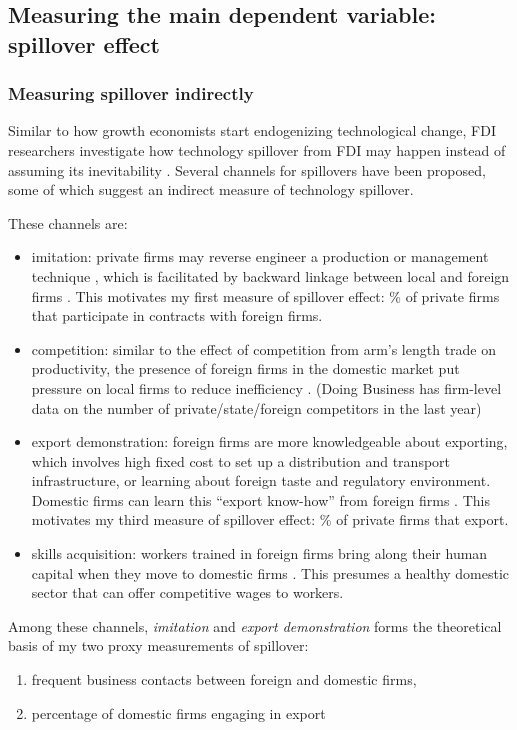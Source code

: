 \subsection{Measuring the main dependent variable: spillover effect}

\subsubsection*{Measuring spillover indirectly}

Similar to how growth economists start endogenizing technological change, FDI researchers investigate how technology spillover from FDI may happen instead of assuming its inevitability \citep{Romer1994}. Several channels for spillovers have been proposed, some of which suggest an indirect measure of technology spillover.

These channels are:
\begin{itemize}
	\item imitation:  private firms may reverse engineer a production or management technique \citep{Wang1992}, which is facilitated by backward linkage between local and foreign firms \citep{Javorcik2004}. This motivates my first measure of spillover effect: \% of private firms that participate in contracts with foreign firms.
	\item competition: similar to the effect of competition from arm's length trade on productivity, the presence of foreign firms in the domestic market put pressure on local firms to reduce inefficiency \citep{Glass2002}. (Doing Business has firm-level data on the number of private/state/foreign competitors in the last year)
	\item export demonstration: foreign firms are more knowledgeable about exporting, which involves high fixed cost to set up a distribution and transport infrastructure, or learning about foreign taste and regulatory environment. Domestic firms can learn this ``export know-how'' from foreign firms \citep{Aitken1997}. This motivates my third measure of spillover effect: \% of private firms that export.
	\item skills acquisition: workers trained in foreign firms bring along their human capital when they move to domestic firms \citep{Djankov2000}. This presumes a healthy domestic sector that can offer competitive wages to workers.
\end{itemize}

Among these channels, \textit{imitation} and \textit{export demonstration} forms the theoretical basis of my two proxy measurements of spillover:
\begin{enumerate}
\item frequent business contacts between foreign and domestic firms,
\item percentage of domestic firms engaging in export
\end{enumerate}

